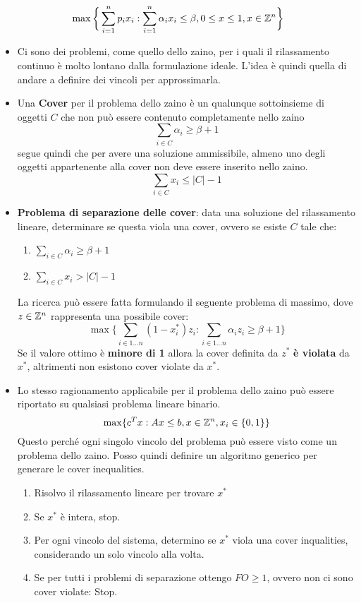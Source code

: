 $$
\max \bigg\{ \sum\limits_{i=1}^n p_ix_i : \sum\limits_{i=1}^n \alpha_i x_i \leq \beta, 0 \leq x \leq 1, x \in \mathbb{Z}^n  \bigg\}
$$

\begin{itemize}
	\item Ci sono dei problemi, come quello dello zaino, per i quali il rilassamento continuo è molto lontano dalla formulazione ideale. L'idea è quindi quella di andare a definire dei vincoli per approssimarla.
	\item Una \textbf{Cover} per il problema dello zaino è un qualunque sottoinsieme di oggetti $C$ che non può essere contenuto completamente nello zaino
	$$
	\sum_{i \in C} \alpha_i \geq \beta +1
	$$
	segue quindi che per avere una soluzione ammissibile, almeno uno degli oggetti appartenente alla cover non deve essere inserito nello zaino.
	$$
	\sum_{i \in C} x_i \leq |C|-1
	$$
	\item \textbf{Problema di separazione delle cover}: data una soluzione del rilassamento lineare, determinare se questa viola una cover, ovvero se esiste $C$ tale che:
	\begin{enumerate}
		\item $\sum_{i \in C} \alpha_i \geq \beta +1$
		\item $ 	\sum_{i \in C} x_i > |C|-1$
	\end{enumerate}
	La ricerca può essere fatta formulando il seguente problema di massimo, dove $z \in \mathbb{Z}^n$ rappresenta una possibile cover:
	$$
	\max \bigg\{ \sum_{i \in 1\ldots n}(1 - x_{i}^*)z_i : \sum_{i \in 1 \ldots n} \alpha_i z_i \geq \beta +1 \bigg\}
	$$
	Se il valore ottimo è \textbf{minore di 1} allora la cover definita da $z^*$ \textbf{è violata} da $x^*$, altrimenti non esistono cover violate da $x^*$.
	\item Lo stesso ragionamento applicabile per il problema dello zaino può essere riportato su qualsiasi problema lineare binario.
	$$
	\max \{  c^Tx : Ax \leq b, x \in \mathbb{Z}^n, x_i \in \{0,1\} \}
	$$
	Questo perché ogni singolo vincolo del problema può essere visto come un problema dello zaino.
	Posso quindi definire un algoritmo generico per generare le cover inequalities.
	\begin{enumerate}
		\item Risolvo il rilassamento lineare per trovare $x^*$
		\item Se $x^*$ è intera, stop.
		\item Per ogni vincolo del sistema, determino se $x^*$ viola una cover inqualities, considerando un solo vincolo alla volta.
		\item Se per tutti i problemi di separazione ottengo $FO \geq 1$, ovvero non ci sono cover violate: Stop.

\end{enumerate}
\end{itemize}
